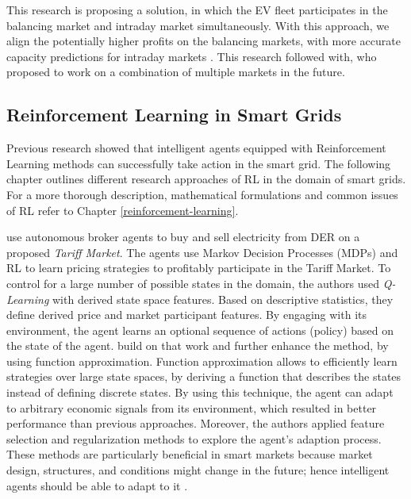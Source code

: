 \documentclass[12pt, article]{article}
\begin{document}
This research is proposing a solution, in which the EV fleet participates in the
balancing market and intraday market simultaneously. With this approach, we
align the potentially higher profits on the balancing markets, with more
accurate capacity predictions for intraday markets
\parencite{tomic07_using_fleet_elect_drive_vehic_grid_suppor}. This research followed
\textcite{kahlen17_fleet} with, who proposed to work on a combination of multiple
markets in the future.

\subsection{Reinforcement Learning in Smart Grids}
\label{sec:orgabb1d87}

Previous research showed that intelligent agents equipped with Reinforcement
Learning methods can successfully take action in the smart grid. The following
chapter outlines different research approaches of RL in the domain of smart
grids. For a more thorough description, mathematical formulations and common
issues of RL refer to Chapter \ref{reinforcement-learning}.

\textcite{reddy11_learn_behav_multip_auton_agent,reddy11_strat} use autonomous
broker agents to buy and sell electricity from DER on a proposed \emph{Tariff
Market}. The agents use Markov Decision Processes (MDPs) and RL to learn pricing
strategies to profitably participate in the Tariff Market. To control for a
large number of possible states in the domain, the authors used \emph{Q-Learning}
with derived state space features. Based on descriptive statistics, they define
derived price and market participant features. By engaging with its environment,
the agent learns an optional sequence of actions (policy) based on the state of
the agent. \textcite{peters13_reinf_learn_approac_to_auton} build on that work and
further enhance the method, by using function approximation. Function
approximation allows to efficiently learn strategies over large state spaces, by
deriving a function that describes the states instead of defining discrete
states. By using this technique, the agent can adapt to arbitrary economic
signals from its environment, which resulted in better performance than previous
approaches. Moreover, the authors applied feature selection and regularization
methods to explore the agent's adaption process. These methods are particularly
beneficial in smart markets because market design, structures, and conditions
might change in the future; hence intelligent agents should be able to adapt to
it \parencite{peters13_reinf_learn_approac_to_auton}.
\end{document}

